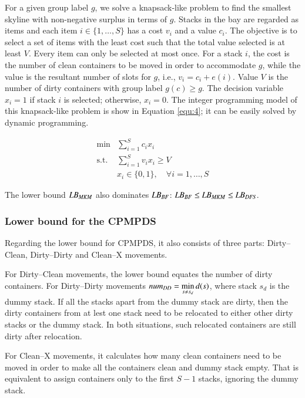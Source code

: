 \documentclass[review,3p,times,authoryear,12pt]{elsarticle}
\begin{document}
For a given group label $g$, we solve a knapsack-like problem to find the smallest skyline with non-negative surplus in terms of $g$. Stacks in the bay are regarded as items and each item $i\in\{1,\dots,S\}$ has a cost $v_i$ and a value $c_i$. The objective is to select a set of items with the least cost such that the total value selected is at least $V$. Every item can only be selected at most once. For a stack $i$, the cost is the number of clean containers to be moved in order to accommodate $g$, while the value is the resultant number of slots for $g$, i.e., $v_i=c_i+e(i)$. Value $V$ is the number of dirty containers with group label $g(c)\ge g$. The decision variable $x_i=1$ if stack $i$ is selected; otherwise, $x_i=0$. The integer programming model of this knapsack-like problem is show in Equation \ref{equ:4}; it can be easily solved by dynamic programming.


\begin{equation}
\label{equ:4}
\begin{array}{rl}
\min & \sum_{i=1}^S c_i x_i\\
\mathrm{s.t.} &\sum_{i=1}^S v_i x_i\ge V\\
&x_i\in\{0,1\}, \quad \forall i=1,\dots,S
\end{array}
\end{equation}

The lower bound $\id{LB}_\id{MKM}$ also dominates $\id{LB}_\id{BF}$: $\id{LB}_\id{BF}\le \id{LB}_\id{MKM}\le \id{LB}_\id{DFS}$.

\subsubsection{Lower bound for the CPMPDS}

Regarding the lower bound for CPMPDS, it also consists of three parts: Dirty--Clean, Dirty--Dirty and Clean--X movements.

For Dirty--Clean movements, the lower bound equates the number of dirty containers. For Dirty--Dirty movements $\id{num}_\id{DD}=\min\limits_{s\neq s_d} d(s)$, where stack $s_d$ is the dummy stack. If all the stacks apart from the dummy stack are dirty, then the dirty containers from at lest one stack need to be relocated to either other dirty stacks or the dummy stack. In both situations, such relocated containers are still dirty after relocation.

For Clean--X movements, it calculates how many clean containers need to be moved in order to make all the containers clean and dummy stack empty. That is equivalent to assign containers only to the first $S-1$ stacks, ignoring the dummy stack.
\end{document}
